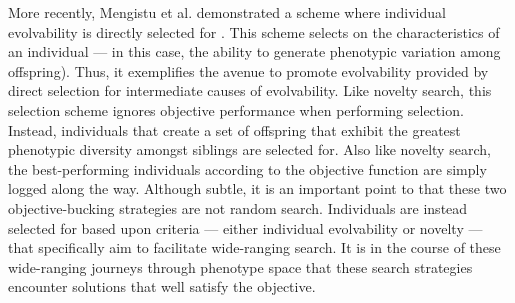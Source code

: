 More recently, Mengistu et al. demonstrated a scheme where individual evolvability is directly selected for  \cite{Mengistu2016EvolvabilityIt}.
This scheme selects on the characteristics of an individual --- in this case, the ability to generate phenotypic variation among offspring).
Thus, it exemplifies the avenue to promote evolvability provided by direct selection for intermediate causes of evolvability.
Like novelty search, this selection scheme ignores objective performance when performing selection.
Instead, individuals that create a set of offspring that exhibit the greatest phenotypic diversity amongst siblings are selected for.
Also like novelty search, the best-performing individuals according to the objective function are simply logged along the way.
Although subtle, it is an important point to that these two objective-bucking strategies are not random search. Individuals are instead selected for based upon criteria --- either individual evolvability or novelty --- that specifically aim to facilitate wide-ranging search.
It is in the course of these wide-ranging journeys through phenotype space that these search strategies encounter solutions that well satisfy the objective.

